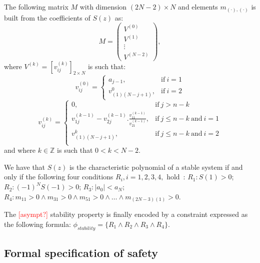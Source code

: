 \documentclass[twocolumn]{autart}    %
\renewcommand{\note}[1]{\textcolor{red}{[#1]}}
\begin{document}
The following matrix $M$ with dimension $(2N-2)\times N$ and elements $m_{(\cdot),(\cdot)}$ is built from the coefficients of $S(z)$ as:  
%
$$
M=\left( 
\begin{array}{c}
V^{(0)}\\
V^{(1)}\\
\vdots\\
V^{(N-2)}
\end{array}
\right), 
$$
%
where $V^{(k)} = [v^{(k)}_{ij} ]_{2\times N}$ is such that:
%
$$
v_{ij}^{(0)}=\left\{
\begin{array}{ll}
a_{j-1}, & \mbox{if}~i=1\\
v_{(1)(N-j+1)}^{0},&\mbox{if}~i=2
\end{array}
\right.
$$
%
$$
v_{ij}^{(k)}=\left\{
\begin{array}{ll}
0,&\mbox{if}~j>n-k\\
v_{1j}^{(k-1)}-v_{2j}^{(k-1)} . \frac{v_{11}^{(k-1)}}{v_{21}^{(k-1)}}, & \mbox{if}~j\leq n-k ~\mbox{and}~i=1\\
v_{(1)(N-j+1)}^{k},& \mbox{if}~j\leq n-k ~\mbox{and}~i=2\\
\end{array}
\right.
$$
%
and where $k \in \mathbb{Z}$ is such that $0 < k < N - 2$.  

We have that $S(z)$ is the characteristic polynomial of a stable system if and only if the following four conditions $R_i, i = 1,2,3,4,$ hold~\cite{astrom1997computer}:
$R_1: S(1) > 0$;
$R_2: (-1)^N S(-1) > 0$;
$R_3: |a_0| < a_N$;
$R_4: m_{11} > 0 \wedge\allowbreak
      m_{31}>0 \wedge\allowbreak
      m_{51}>0 \wedge \ldots \wedge\allowbreak
      m_{(2N{-}3)(1)}>0$.

The \note{asympt?} stability property is finally encoded by a constraint expressed as the following formula: 
$
\phi_\mathit{stability} = \{R_1 \wedge R_2 \wedge R_3 \wedge R_4\}.
$

\ifx\safetyrep
\subsection{Formal specification of safety} 
\label{ssec:safespecification}
\end{document}
